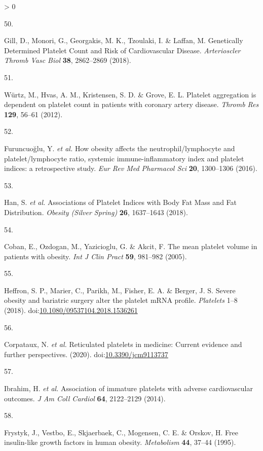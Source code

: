 \documentclass[11pt,twoside]{bristolthesis}
\newlength{\cslhangindent}
\newlength{\csllabelwidth}
\newenvironment{CSLReferences}[2] %
 {%
  \setlength{\parindent}{0pt}
  \ifodd #1 \everypar{\setlength{\hangindent}{\cslhangindent}}\ignorespaces\fi
  \ifnum #2 > 0
  \setlength{\parskip}{#2\baselineskip}
  \fi
 }%
 {}
\newcommand{\CSLLeftMargin}[1]{\parbox[t]{\csllabelwidth}{#1}}
\newcommand{\CSLRightInline}[1]{\parbox[t]{\linewidth - \csllabelwidth}{#1}\break}
\begin{document}
\begin{CSLReferences}{0}{0}
\leavevmode\hypertarget{ref-Gill2018}{}%
\CSLLeftMargin{50. }
\CSLRightInline{Gill, D., Monori, G., Georgakis, M. K., Tzoulaki, I. \& Laffan, M. {Genetically Determined Platelet Count and Risk of Cardiovascular Disease}. \emph{Arterioscler Thromb Vasc Biol} \textbf{38}, 2862--2869 (2018).}

\leavevmode\hypertarget{ref-Wurtz2012}{}%
\CSLLeftMargin{51. }
\CSLRightInline{Würtz, M., Hvas, A. M., Kristensen, S. D. \& Grove, E. L. {Platelet aggregation is dependent on platelet count in patients with coronary artery disease}. \emph{Thromb Res} \textbf{129}, 56--61 (2012).}

\leavevmode\hypertarget{ref-Furuncuoglu2016}{}%
\CSLLeftMargin{52. }
\CSLRightInline{Furuncuoğlu, Y. \emph{et al.} {How obesity affects the neutrophil/lymphocyte and platelet/lymphocyte ratio, systemic immune-inflammatory index and platelet indices: a retrospective study}. \emph{Eur Rev Med Pharmacol Sci} \textbf{20}, 1300--1306 (2016).}

\leavevmode\hypertarget{ref-Han2018a}{}%
\CSLLeftMargin{53. }
\CSLRightInline{Han, S. \emph{et al.} {Associations of Platelet Indices with Body Fat Mass and Fat Distribution}. \emph{Obesity (Silver Spring)} \textbf{26}, 1637--1643 (2018).}

\leavevmode\hypertarget{ref-Coban2005}{}%
\CSLLeftMargin{54. }
\CSLRightInline{Coban, E., Ozdogan, M., Yazicioglu, G. \& Akcit, F. {The mean platelet volume in patients with obesity}. \emph{Int J Clin Pract} \textbf{59}, 981--982 (2005).}

\leavevmode\hypertarget{ref-Heffron2018}{}%
\CSLLeftMargin{55. }
\CSLRightInline{Heffron, S. P., Marier, C., Parikh, M., Fisher, E. A. \& Berger, J. S. {Severe obesity and bariatric surgery alter the platelet mRNA profile}. \emph{Platelets} 1--8 (2018). doi:\href{https://doi.org/10.1080/09537104.2018.1536261}{10.1080/09537104.2018.1536261}}

\leavevmode\hypertarget{ref-Corpataux2020}{}%
\CSLLeftMargin{56. }
\CSLRightInline{Corpataux, N. \emph{et al.} {Reticulated platelets in medicine: Current evidence and further perspectives}. (2020). doi:\href{https://doi.org/10.3390/jcm9113737}{10.3390/jcm9113737}}

\leavevmode\hypertarget{ref-Ibrahim2014}{}%
\CSLLeftMargin{57. }
\CSLRightInline{Ibrahim, H. \emph{et al.} {Association of immature platelets with adverse cardiovascular outcomes}. \emph{J Am Coll Cardiol} \textbf{64}, 2122--2129 (2014).}

\leavevmode\hypertarget{ref-Frystyk1995}{}%
\CSLLeftMargin{58. }
\CSLRightInline{Frystyk, J., Vestbo, E., Skjaerbaek, C., Mogensen, C. E. \& Orskov, H. {Free insulin-like growth factors in human obesity}. \emph{Metabolism} \textbf{44}, 37--44 (1995).}


\end{CSLReferences}
\end{document}
